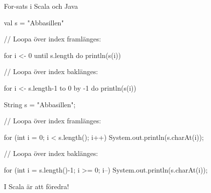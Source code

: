 \begin{Slide}{For-sats i Scala och Java}
\begin{multicols}{2}
\noindent{}
\begin{CodeSmall}[basicstyle=\ttfamily\SlideFontSize{6}{8},backgroundcolor=\color{white},
  frame=none]
val s = "Abbasillen"

// Loopa över index framlänges:

for i <- 0 until s.length do
  println(s(i))


// Loopa över index baklänges:

for i <- s.length-1 to 0 by -1 do
  println(s(i))

\end{CodeSmall}

\columnbreak

\noindent{}
\begin{CodeSmall}[language=Java,basicstyle=\ttfamily\SlideFontSize{6}{8},backgroundcolor=\color{white},
  frame=none]
String s = "Abbasillen";

// Loopa över index framlänges:

for (int i = 0; i < s.length(); i++) {
    System.out.println(s.charAt(i));
}

// Loopa över index baklänges:

for (int i = s.length()-1; i >= 0; i--) {
    System.out.println(s.charAt(i));
}
\end{CodeSmall}
\end{multicols}
I Scala är  att föredra!
\end{Slide}

\ifkompendium  %
\clearpage
\fi


